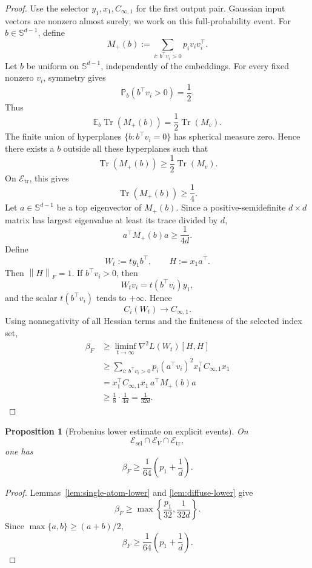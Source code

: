 \documentclass[11pt]{article}
\newtheorem{proposition}[theorem]{Proposition}
\newcommand{\E}{\mathbb{E}}
\newcommand{\Pp}{\mathbb{P}}
\newcommand{\1}{\mathbf{1}}
\newcommand{\Tr}{\operatorname{Tr}}
\newcommand{\norm}[1]{\left\|#1\right\|}
\newcommand{\sphere}{\mathbb{S}}
\begin{document}
\begin{proof}
Use the selector \(y_1,x_1,C_{\infty,1}\) for the first output pair.  Gaussian
input vectors are nonzero almost surely; we work on this full-probability
event.  For \(b\in\sphere^{d-1}\), define
\[
 M_+(b)
 :=
 \sum_{i:\,b^\top v_i>0}p_i v_iv_i^\top.
\]
Let \(b\) be uniform on \(\sphere^{d-1}\), independently of the embeddings.
For every fixed nonzero \(v_i\), symmetry gives
\[
 \Pp_b(b^\top v_i>0)=\frac12.
\]
Thus
\[
 \E_b\Tr(M_+(b))
 =
 \frac12\Tr(M_v).
\]
The finite union of hyperplanes \(\{b:b^\top v_i=0\}\) has spherical measure
zero.  Hence there exists a \(b\) outside all these hyperplanes such that
\[
 \Tr(M_+(b))\ge\frac12\Tr(M_v).
\]
On \(\mathcal E_{\mathrm{tr}}\), this gives
\[
 \Tr(M_+(b))\ge\frac14.
\]
Let \(a\in\sphere^{d-1}\) be a top eigenvector of \(M_+(b)\).  Since a
positive-semidefinite \(d\times d\) matrix has largest eigenvalue at least its
trace divided by \(d\),
\[
 a^\top M_+(b)a\ge\frac1{4d}.
\]
Define
\[
 W_t:=t y_1b^\top,
 \qquad
 H:=x_1a^\top.
\]
Then \(\norm{H}_F=1\).  If \(b^\top v_i>0\), then
\[
 W_tv_i=t(b^\top v_i)y_1,
\]
and the scalar \(t(b^\top v_i)\) tends to \(+\infty\).  Hence
\[
 C_i(W_t)\longrightarrow C_{\infty,1}.
\]
Using nonnegativity of all Hessian terms and the finiteness of the selected
index set,
\begin{align*}
 \beta_F
 &\ge
 \liminf_{t\to\infty}\nabla^2L(W_t)[H,H]\\
 &\ge
 \sum_{i:\,b^\top v_i>0}
 p_i(a^\top v_i)^2x_1^\top C_{\infty,1}x_1\\
 &=
 x_1^\top C_{\infty,1}x_1\,a^\top M_+(b)a\\
 &\ge
 \frac18\cdot\frac1{4d}
 =\frac1{32d}.
\end{align*}
\end{proof}

\begin{proposition}[Frobenius lower estimate on explicit events]
\label{prop:frobenius-lower}
On
\[
 \mathcal E_{\mathrm{sel}}
 \cap\mathcal E_V
 \cap\mathcal E_{\mathrm{tr}},
\]
one has
\[
 \beta_F
 \ge
 \frac1{64}\left(p_1+\frac1d\right).
\]
\end{proposition}

\begin{proof}
Lemmas~\ref{lem:single-atom-lower} and \ref{lem:diffuse-lower} give
\[
 \beta_F
 \ge
 \max\left\{\frac{p_1}{32},\frac1{32d}\right\}.
\]
Since \(\max\{a,b\}\ge(a+b)/2\),
\[
 \beta_F
 \ge
 \frac1{64}\left(p_1+\frac1d\right).
\]
\end{proof}
\end{document}

